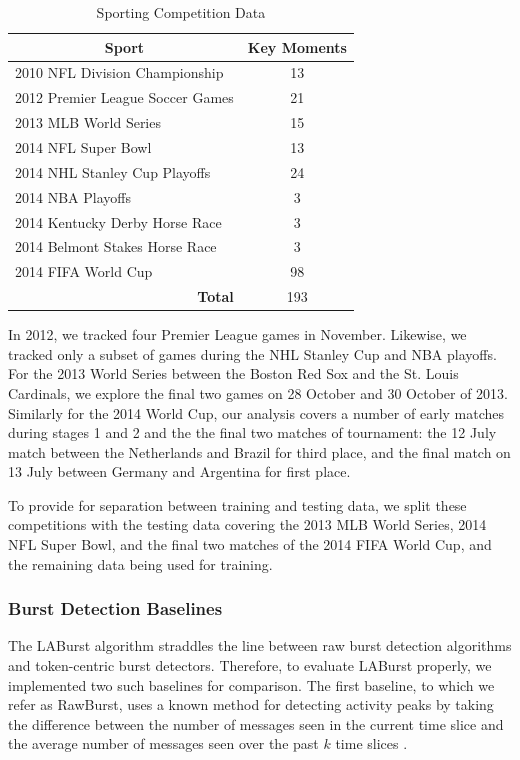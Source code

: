 \documentclass[letterpaper]{article}
\begin{document}
\begin{table}[htdp]
\caption{Sporting Competition Data}
\begin{center}
\begin{tabular}{|p{2in}|c|}
\hline
\multicolumn{1}{|c|}{\textbf{Sport}} & \textbf{Key Moments} \\ \hline
2010 NFL Division Championship & 13 \\ \hline
2012 Premier League Soccer Games & 21 \\ \hline
2013 MLB World Series  & 15 \\ \hline
2014 NFL Super Bowl & 13 \\ \hline
2014 NHL Stanley Cup Playoffs & 24 \\ \hline
2014 NBA Playoffs & 3 \\ \hline
2014 Kentucky Derby Horse Race & 3 \\ \hline
2014 Belmont Stakes Horse Race & 3 \\ \hline
2014 FIFA World Cup & 98 \\ \hline
\multicolumn{1}{|r|}{\textbf{Total}} & 193 \\ \hline
\end{tabular}
\end{center}
\label{tab:eventStats}
\end{table}

In 2012, we tracked four Premier League games in November.
Likewise, we tracked only a subset of games during the NHL Stanley Cup and NBA playoffs.
For the 2013 World Series between the Boston Red Sox and the St. Louis Cardinals, we explore the final two games on 28 October and 30 October of 2013.
Similarly for the 2014 World Cup, our analysis covers a number of early matches during stages 1 and 2 and the the final two matches of tournament: the 12 July match between the Netherlands and Brazil for third place, and the final match on 13 July between Germany and Argentina for first place.

To provide for separation between training and testing data, we split these competitions with the testing data covering the 2013 MLB World Series, 2014 NFL Super Bowl, and the final two matches of the 2014 FIFA World Cup, and the remaining data being used for training.

\subsubsection{Burst Detection Baselines}

The LABurst algorithm straddles the line between raw burst detection algorithms and token-centric burst detectors.
Therefore, to evaluate LABurst properly, we implemented two such baselines for comparison.
The first baseline, to which we refer as RawBurst, uses a known method for detecting activity peaks by taking the difference between the number of messages seen in the current time slice and the average number of messages seen over the past $k$ time slices \cite{vasudevan2013twitter,Lehmann:2012:DCC:2187836.2187871}.
\end{document}
